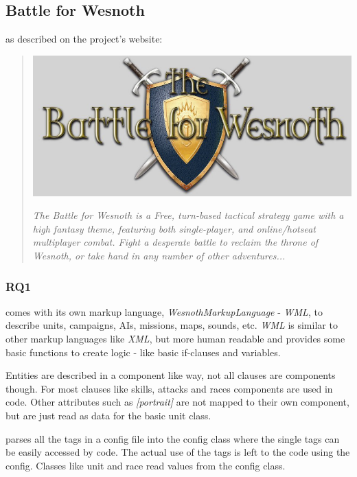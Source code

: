 \subsection{Battle for Wesnoth}
\BOW{} as described on the project's website:
\begin{quote}

\begin{center}\includegraphics[scale=0.4]{pics/wesnothlogo}\end{center}

\textit{The Battle for Wesnoth is a Free, turn-based tactical strategy game with a high fantasy theme, featuring both
single-player, and online/hotseat multiplayer combat. Fight a desperate battle to reclaim the throne of Wesnoth, or take
hand in any number of other adventures... }
\end{quote}

\subsubsection{RQ1}
\BOW{} comes with its own markup language, \textit{WesnothMarkupLanguage} - \textit{WML}, to describe units, campaigns, AIs,
missions, maps, sounds, etc. \textit{WML} is similar to other markup languages like \textit{XML}, but more human readable and provides some basic functions to create logic - like basic if-clauses and variables. 

Entities are described in a component like way, not all clauses are components though. For most clauses like skills,
attacks and races components are used in code. Other attributes such as \textit{[portrait]} are not mapped to their own
component, but are just read as data for the basic unit class. 

\BOW{} parses all the tags in a config file into the config class where the single tags can be easily accessed by code.
The actual use of the tags is left to the code using the config. Classes like unit and race read values from the config
class.

